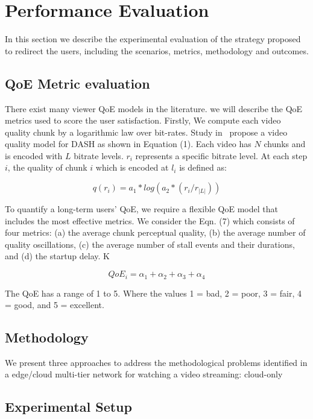 \section{Performance Evaluation}
\label{sec:results}

In this section we describe the experimental evaluation of the strategy proposed to redirect the users, including the scenarios, metrics, methodology and outcomes.


\subsection{QoE Metric evaluation}

There exist many viewer QoE models in the literature. we will describe the QoE metrics used to score the user satisfaction. Firstly, We compute each video quality chunk by a logarithmic law over bit-rates. Study in~ propose a video quality model for DASH as shown in Equation (1). Each video has $N$ chunks and is encoded with $L$ bitrate levels. $r_i$ represents a specific bitrate level. At each step $i$, the quality of chunk $i$ which is encoded at $l_i$ is defined as:

$$
q(r_i) = a_1 * log(a_2 * (r_i/ r_{|L|}))
$$

To quantify a long-term users' QoE, we require a flexible QoE model that includes the most effective metrics. 
We consider the Eqn. (7) which consists of four metrics: (a) the average chunk perceptual quality, (b) the average number of quality oscillations, (c) the average number of stall events and their durations, and (d) the startup delay. K

\begin{equation}\label{qoe-equation}
QoE_i = \alpha_1 + \alpha_2 + \alpha_3 + \alpha_4
\end{equation}


The QoE has a range of 1 to 5. Where the values 1 = bad, 2 = poor, 3 = fair, 4 = good, and 5 = excellent.
 
 
\subsection{Methodology}

We present three approaches to address the methodological problems identified in a edge/cloud multi-tier network for watching a video streaming: cloud-only 

\subsection{Experimental Setup}

